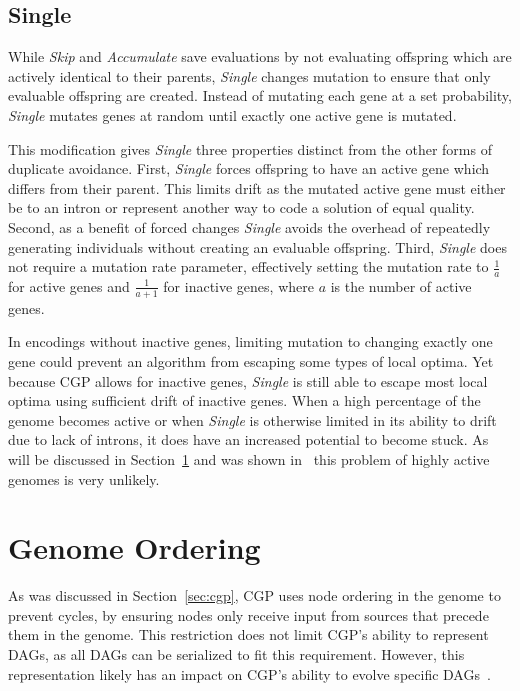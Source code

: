\documentclass[journal]{IEEEtran}
\begin{document}
\subsection{Single}
While \emph{Skip} and \emph{Accumulate} save evaluations by not evaluating offspring
which are actively identical to their parents, \emph{Single} changes
mutation to ensure that only evaluable offspring are created.  Instead
of mutating each gene at a set probability, \emph{Single} mutates genes at
random until exactly one active gene is mutated.

This modification gives \emph{Single} three properties distinct from the other
forms of duplicate avoidance.  First, \emph{Single} forces offspring to have
an active gene which differs from their parent.  This limits drift as the
mutated active gene must either be to an intron or represent another way to
code a solution of equal quality.  Second, as a benefit of forced changes
\emph{Single} avoids the overhead of repeatedly generating individuals without
creating an evaluable offspring.  Third, \emph{Single} does not require a mutation
rate parameter, effectively setting the mutation rate to $\frac{1}{a}$ for active
genes and $\frac{1}{a+1}$ for inactive genes, where $a$ is the number of active genes.

In encodings without inactive genes, limiting mutation to changing exactly one gene
could prevent an algorithm from escaping some types of local optima.  Yet because
CGP allows for inactive genes, \emph{Single} is still able to escape most local
optima using sufficient drift of inactive genes.  When a high percentage of
the genome becomes active or when \emph{Single} is otherwise limited in its ability
to drift due to lack of introns, it does have an increased potential to become stuck.
As will be discussed in Section~\ref{sec:ordering} and was shown in~\cite{goldman:2013:ordering}
this problem of highly active genomes is very unlikely.

\section{Genome Ordering}
\label{sec:ordering}
As was discussed in Section~\ref{sec:cgp}, CGP uses node ordering in the genome
to prevent cycles, by ensuring nodes only receive input from sources that
precede them in the genome.  This restriction does not limit CGP's ability
to represent DAGs, as all DAGs can be serialized to fit this requirement.
However, this representation likely has an impact on CGP's ability to evolve specific
DAGs~\cite{goldman:2013:ordering}.
\end{document}
